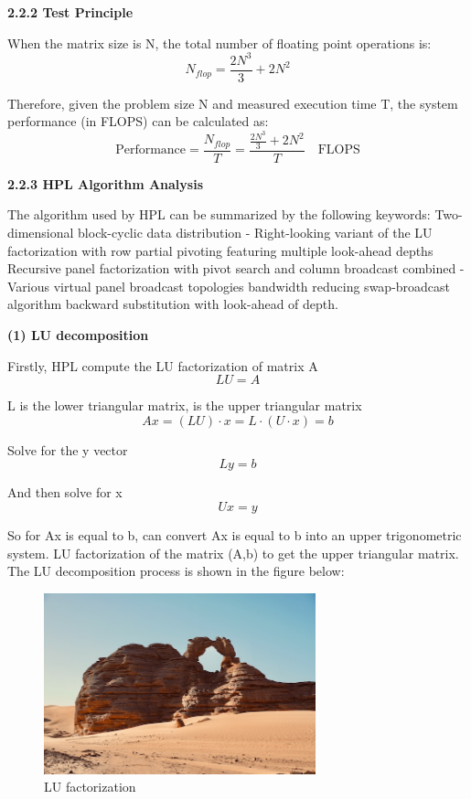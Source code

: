 \documentclass[a4paper,12pt]{article}
\begin{document}
\textbf{2.2.2 Test Principle}

When the matrix size is N, the total number of floating point operations is:
\begin{equation}
    \boxed{N_{flop} = \frac{2N^3}{3} + 2N^2}
\end{equation}

Therefore, given the problem size N and measured execution time T, the system performance (in FLOPS) can be calculated as:
\begin{equation}
    \text{Performance} = \frac{N_{flop}}{T} = \frac{\frac{2N^3}{3} + 2N^2}{T} \quad \text{FLOPS}
\end{equation}

\textbf{2.2.3 HPL Algorithm Analysis}

The algorithm used by HPL can be summarized by the following keywords: Two-dimensional block-cyclic data distribution - Right-looking variant of the LU factorization with row partial pivoting featuring multiple look-ahead depths Recursive panel factorization with pivot search and column broadcast combined - Various virtual panel broadcast topologies bandwidth reducing swap-broadcast algorithm backward substitution with look-ahead of depth.

\textbf{(1) LU decomposition}

Firstly, HPL compute the LU factorization of matrix A
\begin{equation*}
LU=A
\end{equation*}

L is the lower triangular matrix, is the upper triangular matrix
\begin{equation*}
Ax=(LU) \cdot x=L \cdot (U \cdot x)=b
\end{equation*}

Solve for the y vector
\begin{equation*}
Ly=b
\end{equation*}

And then solve for x
\begin{equation*}
U x=y
\end{equation*}

So for Ax is equal to b, can convert Ax is equal to b into an upper trigonometric system. LU factorization of the matrix (A,b) to get the upper triangular matrix. The LU decomposition process is shown in the figure below:

\begin{figure}[H]
    \centering
    \includegraphics[width=0.7\textwidth]{LU_factorization.png}
    \caption{LU factorization}
    \label{fig:lu_factorization}
\end{figure}
\end{document}
